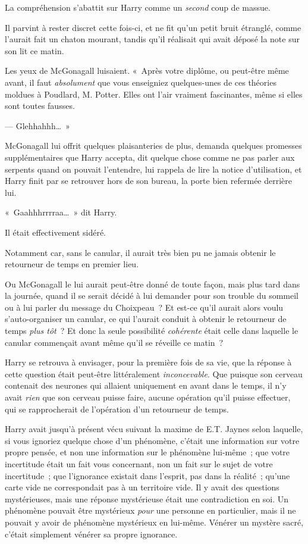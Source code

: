 La compréhension s'abattit sur Harry comme un \emph{second} coup de massue.

Il parvint à rester discret cette fois-ci, et ne fit qu'un petit bruit étranglé, comme l'aurait fait un chaton mourant, tandis qu'il réalisait qui avait déposé la note sur son lit ce matin.

Les yeux de McGonagall luisaient.
«~Après votre diplôme, ou peut-être même avant, il faut \emph{absolument} que vous enseigniez quelques-unes de ces théories moldues à Poudlard, M. Potter.
Elles ont l'air vraiment fascinantes, même si elles sont toutes fausses.

--- Glehhahhh…~»

McGonagall lui offrit quelques plaisanteries de plus, demanda quelques promesses supplémentaires que Harry accepta, dit quelque chose comme ne pas parler aux serpents quand on pouvait l'entendre, lui rappela de lire la notice d'utilisation, et Harry finit par se retrouver hors de son bureau, la porte bien refermée derrière lui.

«~Gaahhhrrrraa…~» dit Harry.

Il était effectivement sidéré.

Notamment car, sans le canular, il aurait très bien pu ne jamais obtenir le retourneur de temps en premier lieu.

Ou McGonagall le lui aurait peut-être donné de toute façon, mais plus tard dans la journée, quand il se serait décidé à lui demander pour son trouble du sommeil ou à lui parler du message du Choixpeau~?
Et est-ce qu'il aurait alors voulu s'auto-organiser un canular, ce qui l'aurait conduit à obtenir le retourneur de temps \emph{plus tôt}~?
Et donc la seule possibilité \emph{cohérente} était celle dans laquelle le canular commençait avant même qu'il se réveille ce matin~?

Harry se retrouva à envisager, pour la première fois de sa vie, que la réponse à cette question était peut-être littéralement \emph{inconcevable}.
Que puisque son cerveau contenait des neurones qui allaient uniquement en avant dans le temps, il n'y avait \emph{rien} que son cerveau puisse faire, aucune opération qu'il puisse effectuer, qui se rapprocherait de l'opération d'un retourneur de temps.

Harry avait jusqu'à présent vécu suivant la maxime de E.T. Jaynes selon laquelle, si vous ignoriez quelque chose d'un phénomène, c'était une information sur votre propre pensée, et non une information sur le phénomène lui-même~;
que votre incertitude était un fait vous concernant, non un fait sur le sujet de votre incertitude~;
que l'ignorance existait dans l'esprit, pas dans la réalité~;
qu'une carte vide ne correspondait pas à un territoire vide.
Il y avait des questions mystérieuses, mais une réponse mystérieuse était une contradiction en soi.
Un phénomène pouvait être mystérieux \emph{pour} une personne en particulier, mais il ne pouvait y avoir de phénomène mystérieux en lui-même.
Vénérer un mystère sacré, c'était simplement vénérer sa propre ignorance.

